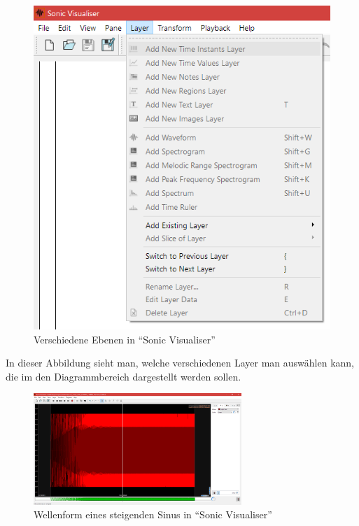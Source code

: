 \documentclass[a4paper]{article}
\begin{document}
\begin{figure}[H]
    \centering
    \begin{minipage}{0.35\textwidth}
        \centering
        \includegraphics[width=1.0\textwidth]{Sonic_Layers.png}
        \caption{Verschiedene Ebenen in "`Sonic Visualiser"'}
    \end{minipage}
\end{figure}
\noindent
In dieser Abbildung sieht man, welche verschiedenen Layer man auswählen kann, die im den Diagrammbereich dargestellt werden sollen.
\vspace{2em}
\begin{figure}[H]
    \centering
    \begin{minipage}{1.0\textwidth}
        \centering
        \includegraphics[width=0.7\textwidth]{Sonic_Sine_Sweep_Wave.png}
        \caption{Wellenform eines steigenden Sinus in "`Sonic Visualiser"'}
    \end{minipage}
\end{figure}
\end{document}
